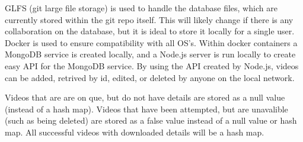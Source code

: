 \documentclass{article}
\newcommand{\br}{ \hfill \break}
\begin{document}
\begin{adjustwidth}{2.5em}{0pt}
GLFS (git large file storage) is used to handle the database files, which are currently stored within the git repo itself. This will likely change if there is any collaboration on the database, but it is ideal to store it locally for a single user. Docker is used to ensure compatibility with all OS's. Within docker containers a MongoDB service is created locally, and a Node.js server is run locally to create easy API for the MongoDB service. By using the API created by Node.js, videos can be added, retrived by id, edited, or deleted by anyone on the local network.

Videos that are are on que, but do not have details are stored as a null value (instead of a hash map). Videos that have been attempted, but are unavalible (such as being deleted) are stored as a false value instead of a null value or hash map. All successful videos with downloaded details will be a hash map.


\end{adjustwidth} \br 
\end{document}
